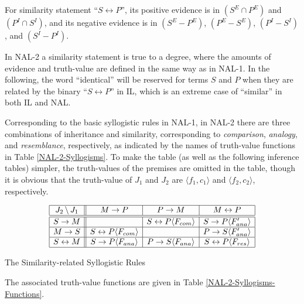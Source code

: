 \begin{defi}
For similarity statement ``\(S \leftrightarrow P\)'', its positive evidence is in $(S^E \cap P^E)$ and $(P^I \cap S^I)$, and its negative evidence is in $(S^E - P^E)$, $(P^E - S^E)$,  $(P^I - S^I)$, and $(S^I - P^I)$.
\end{defi}

In NAL-2 a similarity statement is true to a degree, where the amounts of evidence and truth-value are defined in the same way as in NAL-1. In the following, the word ``identical'' will be reserved for terms $S$ and $P$ when they are related by the binary ``\(S \leftrightarrow P\)'' in IL, which is an extreme case of ``similar'' in both IL and NAL.

Corresponding to the basic syllogistic rules in NAL-1, in NAL-2 there are three combinations of inheritance and similarity, corresponding to {\em comparison}, {\em analogy}, and {\em resemblance}, respectively, as indicated by the names of truth-value functions in Table \ref{NAL-2-Syllogisms}. To make the table (as well as the following inference tables) simpler, the truth-values of the premises are omitted in the table, though it is obvious that the truth-value of $J_1$ and $J_2$ are $\langle f_1, c_1\rangle$ and $\langle f_2, c_2\rangle$, respectively.

\begin{table}[htb]
\[\begin{array}{|c||c|c|c|} \hline
J_2 \, \backslash \, J_1 & M \rightarrow P & P \rightarrow M & M \leftrightarrow P \\
\hline \hline
S \rightarrow M & & S \leftrightarrow P \langle F_{com}\rangle  & S \rightarrow P \langle F'_{ana}\rangle  \\
\hline
M \rightarrow S & S \leftrightarrow P \langle F_{com}\rangle  & & P \rightarrow S \langle F'_{ana}\rangle  \\
\hline
S \leftrightarrow M & S \rightarrow P \langle F_{ana}\rangle  & P \rightarrow S \langle F_{ana}\rangle  & S \leftrightarrow P \langle F_{res}\rangle  \\
\hline \end{array}\]
\caption{The Similarity-related Syllogistic Rules}
\label{NAL-2-Syllogisms}
\end{table}

The associated truth-value functions are given in Table \ref{NAL-2-Syllogisms-Functions}.

